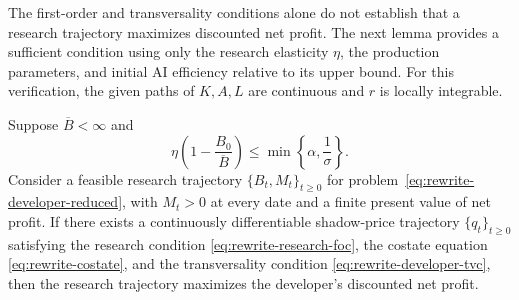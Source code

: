 The first-order and transversality conditions alone do not establish that
a research trajectory maximizes discounted net profit. The next lemma
provides a sufficient condition using only the research elasticity $\eta$, the
production parameters, and initial AI efficiency relative to its upper
bound. For this verification, the given paths of $K,A,L$ are continuous
and $r$ is locally integrable.

\begin{lemma}
\label{lem:rewrite-developer-verification}
Suppose $\overline B<\infty$ and
\begin{equation}
 \eta\left(1-\frac{B_0}{\overline B}\right)
 \leq\min\left\{\alpha,\frac1\sigma\right\}.
 \label{eq:rewrite-research-optimality-condition}
\end{equation}
Consider a feasible research trajectory $\{B_t,M_t\}_{t\geq0}$
for problem~\eqref{eq:rewrite-developer-reduced},
with $M_t>0$ at every date and a finite present value of net profit.
If there exists a continuously differentiable shadow-price trajectory
$\{q_t\}_{t\geq0}$ satisfying the research condition
\eqref{eq:rewrite-research-foc}, the costate equation
\eqref{eq:rewrite-costate}, and the transversality condition
\eqref{eq:rewrite-developer-tvc}, then the research trajectory
maximizes the developer's discounted net profit.
\end{lemma}

